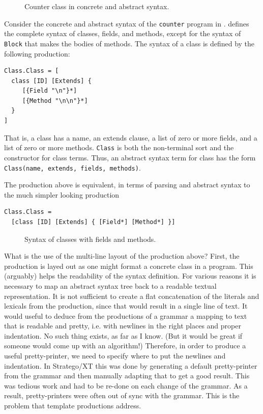 \begin{figure}[t]\small


\caption{Counter class in concrete and abstract syntax.}
\end{figure}

Consider the concrete and abstract syntax of the \texttt{counter} program in
.
 defines the complete syntax of classes, fields, and
methods, except for the syntax of \texttt{Block} that makes the bodies of
methods.
The syntax of a class is defined by the following production:

\begin{lstlisting}[language=SDF]
Class.Class = [
  class [ID] [Extends] {
     [{Field "\n"}*]
     [{Method "\n\n"}*]
  }
]  
\end{lstlisting}

That is, a class has a name, an extends clause, a list of zero
or more fields, and a list of zero or more methods. \texttt{Class} is both the
non-terminal sort and the constructor for class terms. Thus, an abstract syntax
term for class has the form \texttt{Class(name, extends, fields, methods)}.

The production above is equivalent, in terms of parsing and abstract syntax to
the much simpler looking production
  
\begin{lstlisting}[language=SDF]
Class.Class = 
  [class [ID] [Extends] { [Field*] [Method*] }]
\end{lstlisting}

\begin{figure}

\caption{Syntax of classes with fields and methods.}
\end{figure}

What is the use of the multi-line layout of the production above? First, the
production is layed out as one might format a concrete class in a program.
This (arguably) helps the readability of the syntax definition.
For various reasons it is necessary to map an abstract syntax tree back to a
readable textual representation. It is not sufficient to create a flat
concatenation of the literals and lexicals from the production, since that would
result in a single line of text.
It would useful to deduce from the productions of a grammar a mapping to text
that is readable and pretty, i.e. with newlines in the right places and proper
indentation.
No such thing exists, as far as I know. (But it would be great if someone would
come up with an algorithm!) Therefore, in order to produce a useful
pretty-printer, we need to specify where to put the newlines and indentation.
In Stratego/XT \cite{BravenboerKVV08} this was done by generating a default
pretty-printer from the grammar and then manually adapting that to get a good
result. This was tedious work and had to be re-done on each change of the
grammar. As a result, pretty-printers were often out of sync with the grammar.
This is the problem that template productions address.

